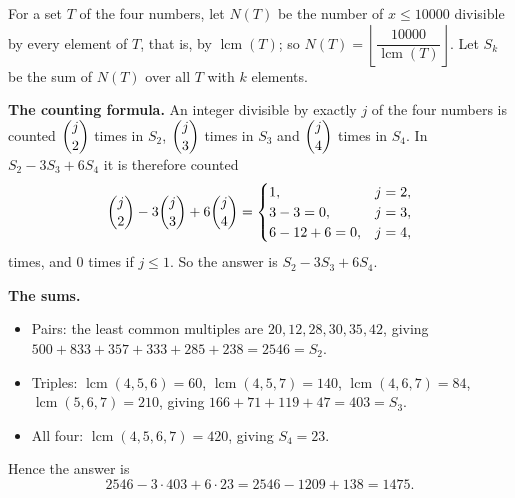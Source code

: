 For a set $T$ of the four numbers, let $N(T)$ be the number of $x\le10000$ divisible by every element of $T$, that is, by $\operatorname{lcm}(T)$; so $N(T)=\left\lfloor\dfrac{10000}{\operatorname{lcm}(T)}\right\rfloor$. Let $S_k$ be the sum of $N(T)$ over all $T$ with $k$ elements.

\textbf{The counting formula.} An integer divisible by exactly $j$ of the four numbers is counted $\dbinom j2$ times in $S_2$, $\dbinom j3$ times in $S_3$ and $\dbinom j4$ times in $S_4$. In $S_2-3S_3+6S_4$ it is therefore counted
\[\dbinom j2-3\dbinom j3+6\dbinom j4=\begin{cases}1,&j=2,\\3-3=0,&j=3,\\6-12+6=0,&j=4,\end{cases}\]
times, and $0$ times if $j\le1$. So the answer is $S_2-3S_3+6S_4$.

\textbf{The sums.}
\begin{itemize}
\item Pairs: the least common multiples are $20,12,28,30,35,42$, giving $500+833+357+333+285+238=2546=S_2$.
\item Triples: $\operatorname{lcm}(4,5,6)=60$, $\operatorname{lcm}(4,5,7)=140$, $\operatorname{lcm}(4,6,7)=84$, $\operatorname{lcm}(5,6,7)=210$, giving $166+71+119+47=403=S_3$.
\item All four: $\operatorname{lcm}(4,5,6,7)=420$, giving $S_4=23$.
\end{itemize}
Hence the answer is
\[2546-3\cdot403+6\cdot23=2546-1209+138=\boxed{1475}.\]
